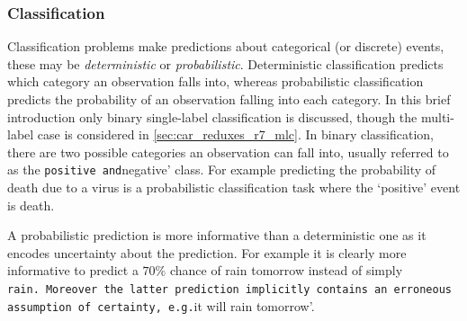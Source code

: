 \documentclass[
  letterpaper,
]{scrbook}
\theoremstyle{plain}
\theoremstyle{definition}
\theoremstyle{remark}
\begin{document}
\subsubsection{Classification}
\label{sec:surv_ml_car_class}

Classification problems make predictions about categorical (or discrete)
events, these may be \emph{deterministic} or \emph{probabilistic}.
Deterministic classification predicts which category an observation
falls into, whereas probabilistic classification predicts the
probability of an observation falling into each category. In this brief
introduction only binary single-label classification is discussed,
though the multi-label case is considered in
\ref{sec:car_reduxes_r7_mlc}. In binary classification, there are two
possible categories an observation can fall into, usually referred to as
the \texttt{positive\textquotesingle{}\ and}negative' class. For example
predicting the probability of death due to a virus is a probabilistic
classification task where the `positive' event is death.

A probabilistic prediction is more informative than a deterministic one
as it encodes uncertainty about the prediction. For example it is
clearly more informative to predict a \(70\%\) chance of rain tomorrow
instead of simply
\texttt{rain\textquotesingle{}.\ Moreover\ the\ latter\ prediction\ implicitly\ contains\ an\ erroneous\ assumption\ of\ certainty,\ e.g.}it
will rain tomorrow'.
\end{document}

